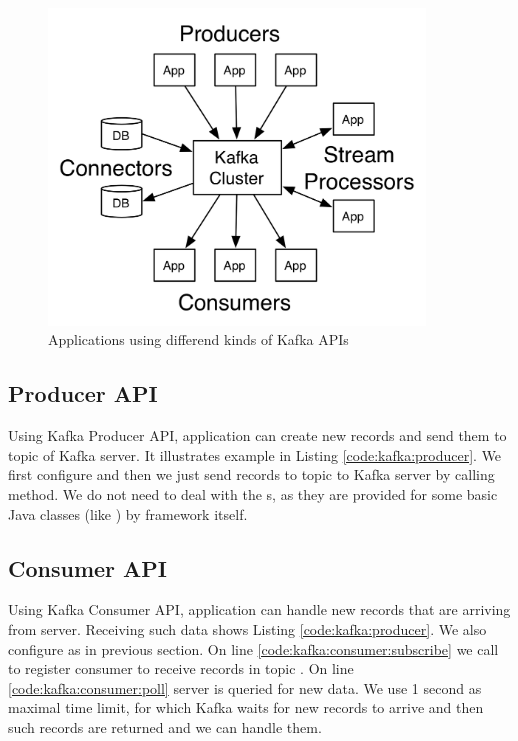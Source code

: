 \begin{figure}[h]
  \center
  \includegraphics[width=100mm]{img/kafka-apis.png}
  \caption{Applications using differend kinds of Kafka APIs}
  \label{frameworks:kafka:api}
\end{figure}




\subsection{Producer API \label{frameworks:kafka:producer}}

Using Kafka Producer API, application can create new records and send them to topic of Kafka server.
It illustrates example in Listing \ref{code:kafka:producer}.
We first configure  and then we just send records to topic 
to Kafka server by calling  method. We do not need to deal with the s,
as they are provided for some basic Java classes (like ) by framework itself.




\subsection{Consumer API \label{frameworks:kafka:consumer}}

Using Kafka Consumer API, application can handle new records that are arriving from server.
Receiving such data shows Listing \ref{code:kafka:producer}.
We also configure  as in previous section.
On line \ref{code:kafka:consumer:subscribe} we call 
to register consumer to receive records in topic .
On line \ref{code:kafka:consumer:poll} server is queried for new data.
We use 1 second as maximal time limit, for which Kafka waits for new records to
arrive and then such records are returned and we can handle them.

